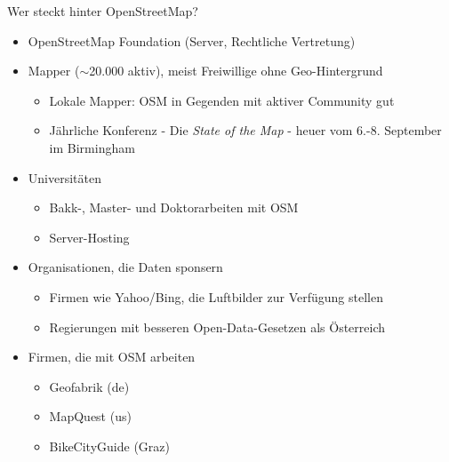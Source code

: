 \documentclass{beamer}
\begin{document}
\begin{frame}{Wer steckt hinter OpenStreetMap?}
  \begin{itemize}
    \item OpenStreetMap Foundation (Server, Rechtliche Vertretung)
      \pause
    \item Mapper ($\sim$20.000 aktiv), meist Freiwillige ohne Geo-Hintergrund
    \begin{itemize}
      \item Lokale Mapper: OSM in Gegenden mit aktiver Community gut
      \item Jährliche Konferenz - Die \emph{State of the Map} - heuer vom 6.-8. September im Birmingham
    \end{itemize}
      \pause
    \item Universitäten
    \begin{itemize}
      \item Bakk-, Master- und Doktorarbeiten mit OSM
      \item Server-Hosting
    \end{itemize}
      \pause
    \item Organisationen, die Daten sponsern
    \begin{itemize}
      \item Firmen wie Yahoo/Bing, die Luftbilder zur Verfügung stellen
      \item Regierungen mit besseren Open-Data-Gesetzen als Österreich
    \end{itemize}
      \pause
    \item Firmen, die mit OSM arbeiten
    \begin{itemize}
      \item Geofabrik (de)
      \item MapQuest (us)
      \item BikeCityGuide (Graz)
    \end{itemize}
  \end{itemize}

\end{frame}
\end{document}
